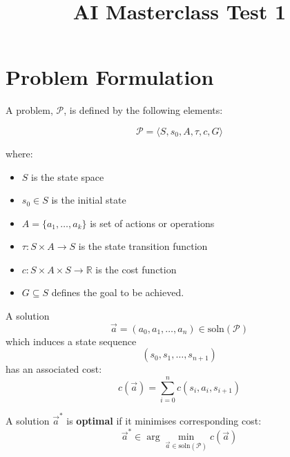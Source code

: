 \documentclass[12pt, a4paper]{article}
\title{AI Masterclass Test 1}
\author{}
\date{}
\begin{document}
\section{Problem Formulation}

\noindent A problem, $\mathcal{P}$, is defined by the following elements:

\[
\mathcal{P} = \langle S, s_0, A, \tau, c, G \rangle
\]

\noindent where:
\begin{itemize}
    \item $S$ is the state space
    \item $s_0 \in S$ is the initial state
    \item $A = \{a_1, \dots, a_k\}$ is set of actions or operations
    \item $\tau : S \times A \to S$ is the state transition function
    \item $c : S \times A \times S \to \mathbb{R}$ is the cost function
    \item $G \subseteq S$ defines the goal to be achieved.
\end{itemize}

\noindent A solution 
\[
\vec{a} = (a_0, a_1, \dots, a_n) \in \text{soln}(\mathcal{P})
\]
which induces a state sequence
\[
(s_0, s_1, \dots, s_{n+1})
\]
has an associated cost:
\[
c(\vec{a}) = \sum_{i=0}^{n} c(s_i, a_i, s_{i+1})
\]

\noindent A solution $\vec{a}^*$ is \textbf{optimal} if it minimises corresponding cost:
\[
\vec{a}^* \in \arg \min_{\vec{a} \in \text{soln}(\mathcal{P})} c(\vec{a})
\]
\end{document}
